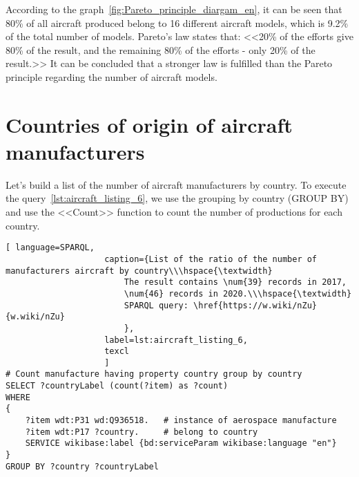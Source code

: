 \begin{figure*}[h]

    \setlength{\fboxsep}{0pt}%
    \setlength{\fboxrule}{1pt}%

	\caption{Percentage of the number of aircraft models produced by all airlines to the total number of aircraft manufactured for all time, 2020.}%
    \label{fig:Pareto_principle_diargam_en}%
\end{figure*}

According to the graph~\ref{fig:Pareto_principle_diargam_en}, it can be seen that 80\% of all aircraft produced belong to 16 different aircraft 
models, which is 9.2\% of the total number of models. Pareto's law states that: <<20\% of the efforts give 80\% of the result, and the remaining 80\%
 of the efforts - only 20\% of the result.>> It can be concluded that a stronger law is fulfilled than the Pareto principle regarding the number 
 of aircraft models.


\section{Countries of origin of aircraft manufacturers}

Let's build a list of the number of aircraft manufacturers by country. To execute the query~\ref{lst:aircraft_listing_6}, we use the grouping 
by country (GROUP BY) and use the <<Count>> function to count the number of productions for each country.

\begin{lstlisting}[ language=SPARQL, 
                    caption={List of the ratio of the number of manufacturers aircraft by country\\\hspace{\textwidth}
                        The result contains \num{39} records in 2017, 
                        \num{46} records in 2020.\\\hspace{\textwidth}
                        SPARQL query: \href{https://w.wiki/nZu}{w.wiki/nZu}
                        },
                    label=lst:aircraft_listing_6,
                    texcl 
                    ]
# Count manufacture having property country group by country
SELECT ?countryLabel (count(?item) as ?count)
WHERE
{
    ?item wdt:P31 wd:Q936518.   # instance of aerospace manufacture
    ?item wdt:P17 ?country.     # belong to country
    SERVICE wikibase:label {bd:serviceParam wikibase:language "en"}
}
GROUP BY ?country ?countryLabel 
\end{lstlisting}

